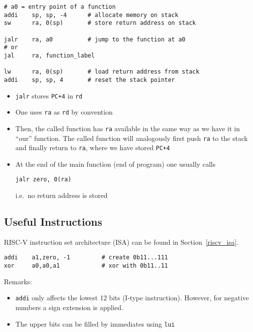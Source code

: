 \begin{lstlisting}[language={[RISC-V]Assembler}]
# a0 = entry point of a function 
addi    sp, sp, -4      # allocate memory on stack
sw      ra, 0(sp)       # store return address on stack

jalr    ra, a0          # jump to the function at a0
# or
jal     ra, function_label

lw      ra, 0(sp)       # load return address from stack 
addi    sp, sp, 4       # reset the stack pointer
\end{lstlisting}

\begin{itemize}
    \item \texttt{jalr} stores \texttt{PC+4} in \texttt{rd}
    \item One uses \texttt{ra} as \texttt{rd} by convention
    \item Then, the called function has \texttt{ra} available in the same way as we have it in ``our'' function. The called function will analogously first push \texttt{ra} to the stack and finally return to \texttt{ra}, where we have stored \texttt{PC+4}
    \item At the end of the main function (end of program) one usually calls
          \begin{lstlisting}[language={[RISC-V]Assembler}]
        jalr zero, 0(ra)
    \end{lstlisting}
          i.e.\ no return address is stored
\end{itemize}

\subsection{Useful Instructions}
RISC-V instruction set architecture (ISA)  can be found in Section\ \ref{riscv_isa}.

\newpar{}

\begin{lstlisting}[language={[RISC-V]Assembler}]
addi    a1,zero, -1         # create 0b11...111
xor     a0,a0,a1            # xor with 0b11..11
\end{lstlisting}
Remarks:
\begin{itemize}
    \item \texttt{addi} only affects the lowest 12 bits (I-type instruction). However, for negative numbers a sign extension is applied.
    \item The upper bits can be filled by immediates using \texttt{lui}
\end{itemize}

